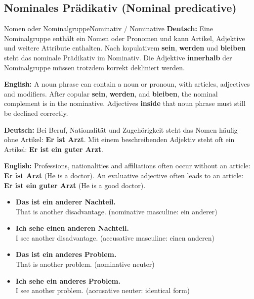 \documentclass[a4paper,11pt]{article}
\newcommand{\GermanText}[1]{\textbf{Deutsch: }#1\par}
\newcommand{\EnglishText}[1]{{\small\color{SoftGray}\textbf{English: }#1\par}}
\newcommand{\ExampleItem}[2]{\item \textbf{#1}\\{\small\color{SoftGray}#2}}
\begin{document}
\subsection{Nominales Prädikativ \textnormal{(Nominal predicative)}}
\begin{grammarentry}{Nomen oder Nominalgruppe}{Nominativ / Nominative}
\GermanText{Eine Nominalgruppe enthält ein Nomen oder Pronomen und kann Artikel, Adjektive und weitere Attribute enthalten. Nach kopulativem \textbf{sein}, \textbf{werden} und \textbf{bleiben} steht das nominale Prädikativ im Nominativ. Die Adjektive \textbf{innerhalb} der Nominalgruppe müssen trotzdem korrekt dekliniert werden.}
\EnglishText{A noun phrase can contain a noun or pronoun, with articles, adjectives and modifiers. After copular \textbf{sein}, \textbf{werden}, and \textbf{bleiben}, the nominal complement is in the nominative. Adjectives \textbf{inside} that noun phrase must still be declined correctly.}
\GermanText{Bei Beruf, Nationalität und Zugehörigkeit steht das Nomen häufig ohne Artikel: \textbf{Er ist Arzt}. Mit einem beschreibenden Adjektiv steht oft ein Artikel: \textbf{Er ist ein guter Arzt}.}
\EnglishText{Professions, nationalities and affiliations often occur without an article: \textbf{Er ist Arzt} (He is a doctor). An evaluative adjective often leads to an article: \textbf{Er ist ein guter Arzt} (He is a good doctor).}
\end{grammarentry}
\begin{exbox}\begin{itemize}
\ExampleItem{Das ist ein anderer Nachteil.}{That is another disadvantage. (nominative masculine: ein anderer)}
\ExampleItem{Ich sehe einen anderen Nachteil.}{I see another disadvantage. (accusative masculine: einen anderen)}
\ExampleItem{Das ist ein anderes Problem.}{That is another problem. (nominative neuter)}
\ExampleItem{Ich sehe ein anderes Problem.}{I see another problem. (accusative neuter: identical form)}
\end{itemize}\end{exbox}
\end{document}
